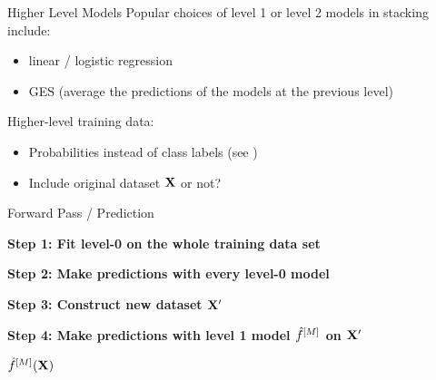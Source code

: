 \documentclass[11pt,compress,t,notes=noshow, aspectratio=169, xcolor=table]{beamer}
\begin{document}
\begin{vbframe}{Higher Level Models}
\vfill
Popular choices of level 1 or level 2 models in stacking include:
\begin{itemize}
    \item linear / logistic regression 
    \item GES (average the predictions of the models at the previous level)
\end{itemize}
\vfill
Higher-level training data:
\begin{itemize}
    \item Probabilities instead of class labels (see \href{https://dl.acm.org/doi/10.5555/1622859.1622868}{})
    \item Include original dataset $\mathbf{X}$ or not?
\end{itemize}
\vfill
\end{vbframe}


\begin{vbframe}{Forward Pass / Prediction}
\vspace{-1.5em}
\begin{algorithm}[H]
    \SetAlgoLined
    \caption{Prediction Using Single Layer Stacking}

    \BlankLine

    \textbf{Step 1: Fit level-0 on the whole training data set}\;\\
    
    \BlankLine
    \textbf{Step 2: Make predictions with every level-0 model}\;\\
    
    \BlankLine
    \textbf{Step 3: Construct new dataset $\mathbf{X}^\prime$}\;\\
    
    \BlankLine
    \textbf{Step 4: Make predictions with level 1 model $\hat{f}^{[M]}$ on $\mathbf{X}^\prime$}\;
    
    \KwRet $\hat{f}^{[M]}(\mathbf{X})$\;
\end{algorithm}

\end{vbframe}
\end{document}
